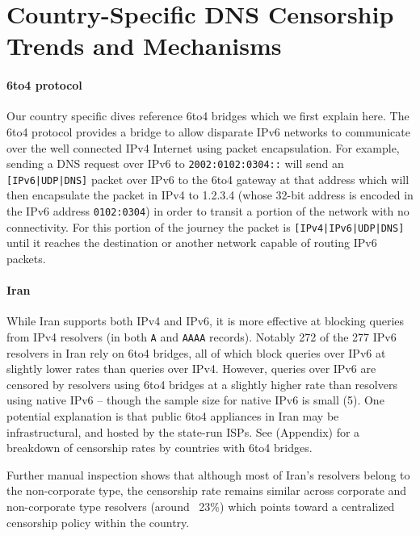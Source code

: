 \section{Country-Specific DNS Censorship Trends and Mechanisms}
\label{sec:cases}

\paragraph{6to4 protocol}
Our country specific dives reference 6to4 bridges which we first explain here.
The 6to4 protocol provides a bridge to allow disparate IPv6 networks to
communicate over the well connected IPv4 Internet using packet encapsulation.
For example, sending a DNS request over IPv6 to \texttt{2002:0102:0304::} will
send an \texttt{[IPv6|UDP|DNS]} packet over IPv6 to the 6to4 gateway at that
address which will then encapsulate the packet in IPv4 to 1.2.3.4 (whose 32-bit
address is encoded in the IPv6 address \texttt{0102:0304}) in order to transit a
portion of the network with no connectivity. For this portion of the journey the
packet is \texttt{[IPv4|IPv6|UDP|DNS]} until it reaches the destination or
another network capable of routing IPv6 packets.


\paragraph{Iran}
While Iran supports both IPv4 and IPv6, it is more effective at blocking queries
from IPv4 resolvers (in both \texttt{A} and \texttt{AAAA} records). Notably 272
of the 277 IPv6 resolvers in Iran rely on 6to4 bridges, all of which block
queries over IPv6 at slightly lower rates than queries over IPv4. However,
queries over IPv6 are censored by resolvers using 6to4 bridges at a slightly
higher rate than resolvers using native IPv6 -- though the sample size for
native IPv6 is small (5). One potential explanation is that public 6to4
appliances in Iran may be infrastructural, and hosted by the state-run ISPs. See
 (Appendix) for a breakdown of censorship
rates by countries with 6to4 bridges.

Further manual inspection shows that although most of Iran's resolvers belong
to the non-corporate type, the censorship rate remains similar across
corporate and non-corporate type resolvers (around ~23\%) which points toward a
centralized censorship policy within the country.


